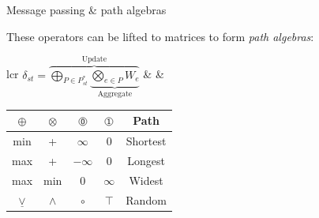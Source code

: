 \documentclass{beamer}
\begin{document}
\begin{frame}[fragile]{Message passing \& path algebras}
    \vspace{2pt}
    These operators can be lifted to matrices to form \textit{path algebras}:
    \begin{center}
        \begin{tabular}{lcr}
            $\delta_{st} = \overbrace{\underset{P\in P_{st}^*}{\bigoplus}\underbrace{\underset{e\in P}{\bigotimes}W_{e}}_{\text{Aggregate}}}^{\text{Update}}$ & &
            \bgroup
            \def\arraystretch{1.2}
            \begin{tabular}{c{1cm}c{1cm}|c{1cm}c{1cm}|c}
                $\oplus$ & $\otimes$ & $\circled{0}$ & $\circled{1}$ & Path     \\\hline
                min      & +         &   $\infty$    &      0        & Shortest \\
                max      & +         &   $-\infty$   &      0        & Longest  \\
                max      & min       &       0       &   $\infty$    & Widest   \\
                $\underline\vee$   & $\land$ &  $\circ$   &  $\top$  & Random \\
            \end{tabular}
            \egroup
        \end{tabular}
    \end{center}
    \end{frame}
\end{document}
